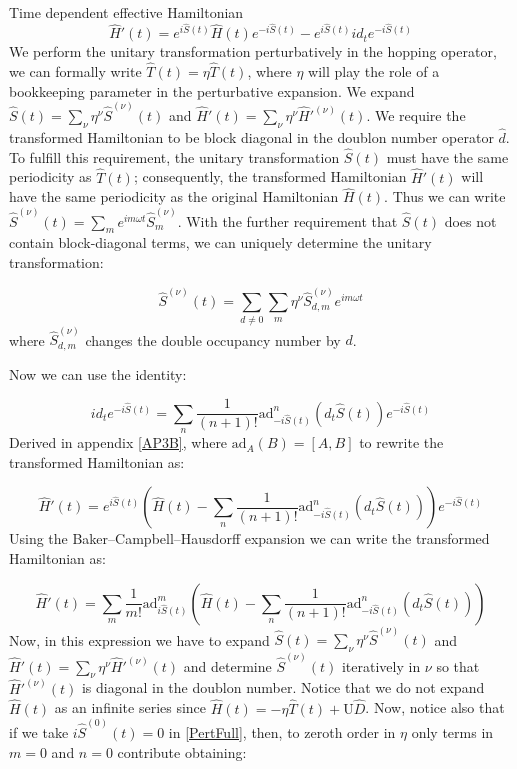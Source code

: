 \begin{section}{Time dependent effective Hamiltonian}
\begin{equation}
\hat{H}'(t) = e^{i\hat{S}(t)} \hat{H}(t) e^{-i\hat{S}(t)} - e^{i\hat{S}(t)} id_t e^{-i\hat{S}(t)}
\end{equation} 
We perform the unitary transformation perturbatively in the hopping operator, we can formally write $\hat{T}(t) = \eta \hat{T}(t)$, where $\eta$ will play the role of a bookkeeping parameter in the perturbative expansion. We expand $\hat{S}(t) = \sum_\nu \eta^\nu \hat{S}^{(\nu)}(t)$ and $\hat{H}'(t) = \sum_\nu \eta^\nu \hat{H}'^{(\nu)}(t)$. We require the transformed Hamiltonian to be block diagonal in the doublon number operator $\hat{d}$. To fulfill this requirement, the unitary transformation $\hat{S}(t)$ must have the same periodicity as $\hat{T}(t)$; consequently, the transformed Hamiltonian $\hat{H}'(t)$ will have the same periodicity as the original Hamiltonian $\hat{H}(t)$. Thus we can write $\hat{S}^{(\nu)}(t) = \sum_m e^{im\omega t}\hat{S}^{(\nu)}_m$. With the further requirement that $\hat{S}(t)$ does not contain block-diagonal terms, we can uniquely determine the unitary transformation:

\begin{equation}
\hat{S}^{(\nu)}(t) = \sum_{d \neq 0} \sum_m \eta^\nu \hat{S}^{(\nu)}_{d,m} e^{im\omega t}
\end{equation}
where $\hat{S}^{(\nu)}_{d,m}$ changes the double occupancy number by $d$.

Now we can use the identity:

\begin{equation}
id_t e^{-i\hat{S}(t)} = \sum_n \frac{1}{(n+1)!}\text{ad}_{-i\hat{S}(t)}^n (d_t \hat{S}(t))e^{-i\hat{S}(t)}
\end{equation}
Derived in appendix \ref{AP3B}, where $\text{ad}_A(B) = [A,B]$ to rewrite the transformed Hamiltonian as:

\begin{equation}
\hat{H}'(t) = e^{i\hat{S}(t)} \left( \hat{H}(t) - \sum_n \frac{1}{(n+1)!}\text{ad}_{-i\hat{S}(t)}^n (d_t \hat{S}(t)) \right) e^{-i\hat{S}(t)}
\end{equation}
Using the Baker–Campbell–Hausdorff expansion we can write the transformed Hamiltonian as:

\begin{equation}
\label{PertFull}
\hat{H}'(t) = \sum_m \frac{1}{m!} \text{ad}_{i\hat{S}(t)}^m \left( \hat{H}(t) - \sum_n \frac{1}{(n+1)!}\text{ad}_{-i\hat{S}(t)}^n (d_t \hat{S}(t)) \right)
\end{equation}
Now, in this expression we have to expand $\hat{S}(t) = \sum_\nu \eta^\nu \hat{S}^{(\nu)}(t)$ and $\hat{H}'(t) = \sum_\nu \eta^\nu \hat{H}'^{(\nu)}(t)$ and determine $\hat{S}^{(\nu)}(t)$ iteratively in $\nu$ so that $\hat{H}'^{(\nu)}(t)$ is diagonal in the doublon number. Notice that we do not expand $\hat{H}(t)$ as an infinite series since $\hat{H}(t) = -\eta \hat{T}(t) + \text{U}\hat{D}$. Now, notice also that if we take $i\hat{S}^{(0)}(t)=0$ in \ref{PertFull}, then, to zeroth order in $\eta$ only terms in $m=0$ and $n=0$ contribute obtaining:


\end{section}
